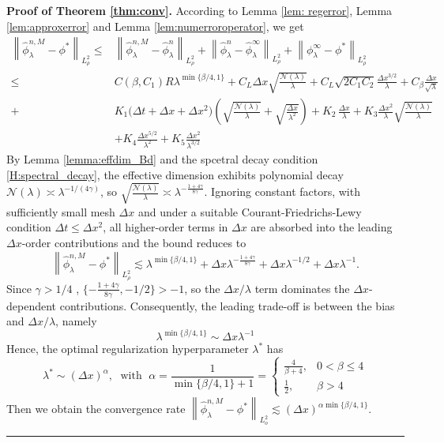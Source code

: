 \documentclass[12pt]{article}
\newenvironment{proof}[1][Proof]{\noindent\textbf{#1.} }{\ \rule{0.5em}{0.5em}}
\numberwithin{equation}{section}
\numberwithin{theorem}{section}
\begin{document}

\begin{proof}[Proof of Theorem \ref{thm:conv}]
According to Lemma \ref{lem: regerror}, Lemma \ref{lem:approxerror} and Lemma \ref{lem:numerroroperator}, we get
$$
\begin{aligned}
\left\|\hat{\phi}_\lambda^{n, M}-\phi^*\right\|_{L_\rho^2} \leq & \left\|\hat{\phi}_\lambda^{n, M}-\hat{\phi}_\lambda^n\right\|_{L^2_{\rho}}+\left\|\hat{\phi}_\lambda^n-\hat{\phi}_\lambda^{\infty}\right\|_{L_\rho^2}+\left\|\phi_\lambda^{\infty}-\phi^*\right\|_{L_\rho^2} \\
\leq & C\left(\beta, C_1\right) R \lambda^{\min \{\beta / 4,1\}} + C_L \Delta x \sqrt{\frac{\mathcal{N}(\lambda)}{\lambda}}+C_L \sqrt{2 C_1 C_2} \frac{\Delta x^{3 / 2}}{\lambda}+C_\beta\frac{\Delta x}{\sqrt{\lambda}}\\
 + & K_1\bigl(\Delta t+\Delta x+\Delta x^2\bigr) \left( \sqrt{\frac{\mathcal{N}(\lambda)}{\lambda}} + \sqrt{\frac{\Delta x}{\lambda^2}}\right) + K_2\,\frac{\Delta x}{\lambda}
+ K_3 \frac{\Delta x^2}{\lambda} \sqrt{\frac{\mathcal{N}(\lambda)}{\lambda}}\\
& + K_4 \frac{\Delta x^{5 / 2}}{\lambda^2}+K_5 \frac{\Delta x^2}{\lambda^{3 / 2}}
\end{aligned}
$$
By Lemma \ref{lemma:effdim_Bd} and the spcetral decay condition \ref{H:spectral_decay},  the effective dimension exhibits polynomial decay $\mathcal{N}(\lambda) \asymp \lambda^{-1 /(4 \gamma)} $, so 
$\sqrt{\frac{\mathcal{N}(\lambda)}{\lambda}} \asymp \lambda^{- \frac{1+ 4 \gamma}{8 \gamma}} $. 
Ignoring constant factors, with
sufficiently small mesh $\Delta x$ and under a suitable Courant-Friedrichs-Lewy condition $\Delta t \leq \Delta x^2$, all higher-order terms in $\Delta x$ are absorbed into the leading $\Delta x$-order contributions and the bound reduces to
$$
\left\|\hat{\phi}_\lambda^{n, M}-\phi^*\right\|_{L_\rho^2} \lesssim \lambda^{\min \{\beta / 4,1\}}+\Delta x \lambda^{-\frac{1+4 \gamma}{8 \gamma}}+\Delta x\lambda^{-1/2}+\Delta x\lambda^{-1}.
$$
Since $\gamma>1/4$ , $\{-\frac{1+4 \gamma}{8 \gamma}, -1/2\}>-1 $, so the $\Delta x / \lambda$ term dominates the $\Delta x$-dependent contributions. Consequently, the leading trade-off is between the bias and $\Delta x / \lambda$, namely
$$
\lambda^{\min \{\beta / 4,1\}} \sim \Delta x \lambda^{-1}
$$
Hence, the optimal regularization hyperparameter $\lambda^*$ has
$$
\lambda^* \sim(\Delta x)^\alpha, \;\text { with } \; \alpha=\frac{1}{\min \{\beta / 4,1\}+1} = \begin{cases}\frac{4}{\beta+4}, & 0<\beta \leq 4 \\ \frac{1}{2}, & \beta>4\end{cases}
$$
Then we obtain the convergence rate
$\left\|\hat{\phi}_\lambda^{n, M}-\phi^*\right\|_{L_o^2} \lesssim(\Delta x)^{\alpha \min \{\beta / 4,1\}}$.
\end{proof}
\end{document}
